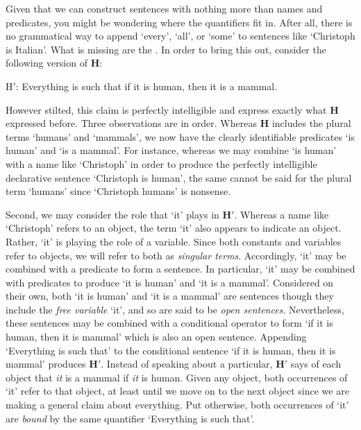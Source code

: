 Given that we can construct sentences with nothing more than names and predicates, you might be wondering where the quantifiers fit in.
After all, there is no grammatical way to append `every', `all', or `some' to sentences like `Christoph is Italian'.
What is missing are the .
In order to bring this out, consider the following version of \textbf{H}:

\begin{ekey}
\item[H$'$:] Everything is such that if it is human, then it is a mammal.
\end{ekey}

However stilted, this claim is perfectly intelligible and express exactly what \textbf{H} expressed before.
Three observations are in order.
Whereas \textbf{H} includes the plural terms `humans' and `mammals', we now have the clearly identifiable predicates `is human' and `is a mammal'.
For instance, whereas we may combine `is human' with a name like `Christoph' in order to produce the perfectly intelligible declarative sentence `Christoph is human', the same cannot be said for the plural term `humans' since `Christoph humans' is nonsense. 

Second, we may consider the role that `it' plays in \textbf{H$'$}.
Whereas a name like `Christoph' refers to an object, the term `it' also appears to indicate an object.
Rather, `it' is playing the role of a variable.
Since both constants and variables refer to objects, we will refer to both as \textit{singular terms}.
Accordingly, `it' may be combined with a predicate to form a sentence.
In particular, `it' may be combined with predicates to produce `it is human' and `it is a mammal'.
Considered on their own, both `it is human' and `it is a mammal' are sentences though they include the \textit{free variable} `it', and so are said to be \textit{open sentences}.
Nevertheless, these sentences may be combined with a conditional operator to form `if it is human, then it is mammal' which is also an open sentence.
Appending `Everything is such that' to the conditional sentence `if it is human, then it is mammal' produces \textbf{H$'$}. %
Instead of speaking about a particular, \textbf{H$'$} says of each object that \textit{it} is a mammal if \textit{it} is human.
Given any object, both occurrences of `it' refer to that object, at least until we move on to the next object since we are making a general claim about everything.
Put otherwise, both occurrences of `it' are \textit{bound} by the same quantifier `Everything is such that'.

